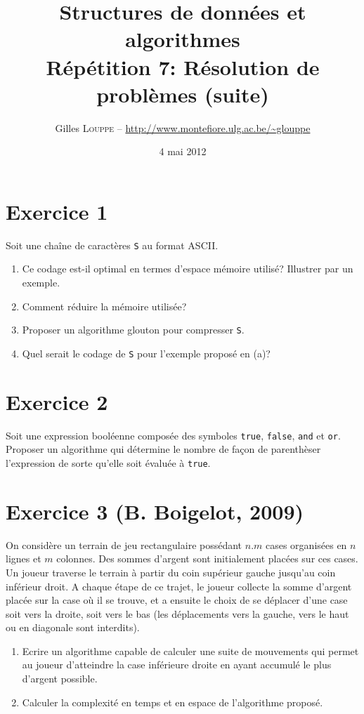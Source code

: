 \documentclass[a4paper,10pt]{article}
\title{
    \textbf{Structures de données et algorithmes}\\
    Répétition 7: Résolution de problèmes (suite)
}
\author{Gilles \textsc{Louppe} -- \url{http://www.montefiore.ulg.ac.be/~glouppe}}
\date{4 mai 2012}
\begin{document}
\maketitle

\section*{Exercice 1}

Soit une chaîne de caractères \texttt{S} au format ASCII.

\begin{enumerate}
\item Ce codage est-il optimal en termes d'espace mémoire utilisé? Illustrer par un exemple.
\item Comment réduire la mémoire utilisée?
\item Proposer un algorithme glouton pour compresser \texttt{S}.
\item Quel serait le codage de \texttt{S} pour l'exemple proposé en (a)?
\end{enumerate}

\section*{Exercice 2}


Soit une expression booléenne composée des symboles \texttt{true},
\texttt{false}, \texttt{and} et \texttt{or}. Proposer un algorithme qui
détermine le nombre de façon de parenthèser l'expression de sorte qu'elle soit
évaluée à \texttt{true}.

\section*{Exercice 3 (B. Boigelot, 2009)}

On considère un terrain de jeu rectangulaire possédant $n.m$ cases organisées en
$n$ lignes et $m$ colonnes. Des sommes d'argent sont initialement placées sur
ces cases. Un joueur traverse le terrain à partir du coin supérieur gauche
jusqu'au coin inférieur droit. A chaque étape de ce trajet, le joueur collecte
la somme d'argent placée sur la case où il se trouve, et a ensuite le choix de
se déplacer d'une case soit vers la droite, soit vers le bas (les déplacements
vers la gauche, vers le haut ou en diagonale sont interdits).

\begin{enumerate}
\item Ecrire un algorithme capable de calculer une suite de mouvements qui
permet au joueur d'atteindre la case inférieure droite en ayant accumulé le
plus d'argent possible.
\item Calculer la complexité en temps et en espace de l'algorithme proposé.
\end{enumerate}
\end{document}
